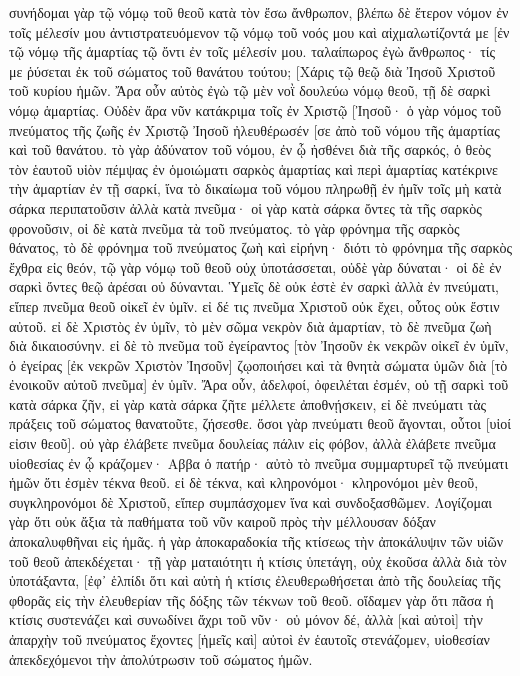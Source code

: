 συνήδομαι γὰρ τῷ νόμῳ τοῦ θεοῦ κατὰ τὸν ἔσω ἄνθρωπον, 
βλέπω δὲ ἕτερον νόμον ἐν τοῖς μέλεσίν μου ἀντιστρατευόμενον τῷ νόμῳ τοῦ νοός μου καὶ αἰχμαλωτίζοντά με [ἐν τῷ νόμῳ τῆς ἁμαρτίας τῷ ὄντι ἐν τοῖς μέλεσίν μου. 
ταλαίπωρος ἐγὼ ἄνθρωπος· τίς με ῥύσεται ἐκ τοῦ σώματος τοῦ θανάτου τούτου; 
[Χάρις τῷ θεῷ διὰ Ἰησοῦ Χριστοῦ τοῦ κυρίου ἡμῶν. Ἄρα οὖν αὐτὸς ἐγὼ τῷ μὲν νοῒ δουλεύω νόμῳ θεοῦ, τῇ δὲ σαρκὶ νόμῳ ἁμαρτίας. 
Οὐδὲν ἄρα νῦν κατάκριμα τοῖς ἐν Χριστῷ [Ἰησοῦ· 
ὁ γὰρ νόμος τοῦ πνεύματος τῆς ζωῆς ἐν Χριστῷ Ἰησοῦ ἠλευθέρωσέν [σε ἀπὸ τοῦ νόμου τῆς ἁμαρτίας καὶ τοῦ θανάτου. 
τὸ γὰρ ἀδύνατον τοῦ νόμου, ἐν ᾧ ἠσθένει διὰ τῆς σαρκός, ὁ θεὸς τὸν ἑαυτοῦ υἱὸν πέμψας ἐν ὁμοιώματι σαρκὸς ἁμαρτίας καὶ περὶ ἁμαρτίας κατέκρινε τὴν ἁμαρτίαν ἐν τῇ σαρκί, 
ἵνα τὸ δικαίωμα τοῦ νόμου πληρωθῇ ἐν ἡμῖν τοῖς μὴ κατὰ σάρκα περιπατοῦσιν ἀλλὰ κατὰ πνεῦμα· 
οἱ γὰρ κατὰ σάρκα ὄντες τὰ τῆς σαρκὸς φρονοῦσιν, οἱ δὲ κατὰ πνεῦμα τὰ τοῦ πνεύματος. 
τὸ γὰρ φρόνημα τῆς σαρκὸς θάνατος, τὸ δὲ φρόνημα τοῦ πνεύματος ζωὴ καὶ εἰρήνη· 
διότι τὸ φρόνημα τῆς σαρκὸς ἔχθρα εἰς θεόν, τῷ γὰρ νόμῳ τοῦ θεοῦ οὐχ ὑποτάσσεται, οὐδὲ γὰρ δύναται· 
οἱ δὲ ἐν σαρκὶ ὄντες θεῷ ἀρέσαι οὐ δύνανται. 
Ὑμεῖς δὲ οὐκ ἐστὲ ἐν σαρκὶ ἀλλὰ ἐν πνεύματι, εἴπερ πνεῦμα θεοῦ οἰκεῖ ἐν ὑμῖν. εἰ δέ τις πνεῦμα Χριστοῦ οὐκ ἔχει, οὗτος οὐκ ἔστιν αὐτοῦ. 
εἰ δὲ Χριστὸς ἐν ὑμῖν, τὸ μὲν σῶμα νεκρὸν διὰ ἁμαρτίαν, τὸ δὲ πνεῦμα ζωὴ διὰ δικαιοσύνην. 
εἰ δὲ τὸ πνεῦμα τοῦ ἐγείραντος [τὸν Ἰησοῦν ἐκ νεκρῶν οἰκεῖ ἐν ὑμῖν, ὁ ἐγείρας [ἐκ νεκρῶν Χριστὸν Ἰησοῦν] ζῳοποιήσει καὶ τὰ θνητὰ σώματα ὑμῶν διὰ [τὸ ἐνοικοῦν αὐτοῦ πνεῦμα] ἐν ὑμῖν. 
Ἄρα οὖν, ἀδελφοί, ὀφειλέται ἐσμέν, οὐ τῇ σαρκὶ τοῦ κατὰ σάρκα ζῆν, 
εἰ γὰρ κατὰ σάρκα ζῆτε μέλλετε ἀποθνῄσκειν, εἰ δὲ πνεύματι τὰς πράξεις τοῦ σώματος θανατοῦτε, ζήσεσθε. 
ὅσοι γὰρ πνεύματι θεοῦ ἄγονται, οὗτοι [υἱοί εἰσιν θεοῦ]. 
οὐ γὰρ ἐλάβετε πνεῦμα δουλείας πάλιν εἰς φόβον, ἀλλὰ ἐλάβετε πνεῦμα υἱοθεσίας ἐν ᾧ κράζομεν· Αββα ὁ πατήρ· 
αὐτὸ τὸ πνεῦμα συμμαρτυρεῖ τῷ πνεύματι ἡμῶν ὅτι ἐσμὲν τέκνα θεοῦ. 
εἰ δὲ τέκνα, καὶ κληρονόμοι· κληρονόμοι μὲν θεοῦ, συγκληρονόμοι δὲ Χριστοῦ, εἴπερ συμπάσχομεν ἵνα καὶ συνδοξασθῶμεν. 
Λογίζομαι γὰρ ὅτι οὐκ ἄξια τὰ παθήματα τοῦ νῦν καιροῦ πρὸς τὴν μέλλουσαν δόξαν ἀποκαλυφθῆναι εἰς ἡμᾶς. 
ἡ γὰρ ἀποκαραδοκία τῆς κτίσεως τὴν ἀποκάλυψιν τῶν υἱῶν τοῦ θεοῦ ἀπεκδέχεται· 
τῇ γὰρ ματαιότητι ἡ κτίσις ὑπετάγη, οὐχ ἑκοῦσα ἀλλὰ διὰ τὸν ὑποτάξαντα, [ἐφ᾽ ἑλπίδι 
ὅτι καὶ αὐτὴ ἡ κτίσις ἐλευθερωθήσεται ἀπὸ τῆς δουλείας τῆς φθορᾶς εἰς τὴν ἐλευθερίαν τῆς δόξης τῶν τέκνων τοῦ θεοῦ. 
οἴδαμεν γὰρ ὅτι πᾶσα ἡ κτίσις συστενάζει καὶ συνωδίνει ἄχρι τοῦ νῦν· 
οὐ μόνον δέ, ἀλλὰ [καὶ αὐτοὶ] τὴν ἀπαρχὴν τοῦ πνεύματος ἔχοντες [ἡμεῖς καὶ] αὐτοὶ ἐν ἑαυτοῖς στενάζομεν, υἱοθεσίαν ἀπεκδεχόμενοι τὴν ἀπολύτρωσιν τοῦ σώματος ἡμῶν. 
